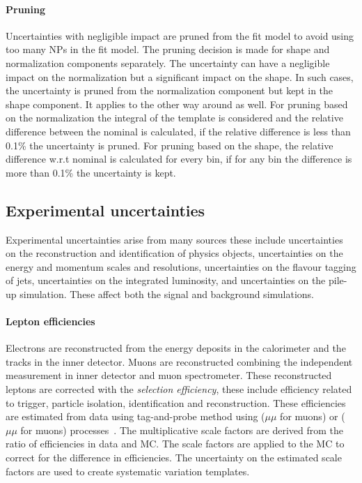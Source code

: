 \paragraph{Pruning}Uncertainties with negligible impact are pruned from the fit model to avoid using too many NPs in the fit model. The pruning decision is made for shape and normalization components separately. The uncertainty can have a negligible impact on the normalization but a significant impact on the shape. In such cases, the uncertainty is pruned from the normalization component but kept in the shape component. It applies to the other way around as well. For pruning based on the normalization the integral of the template is considered and the relative difference between the nominal is calculated, if the relative difference is less than 0.1\% the uncertainty is pruned. For pruning based on the shape, the relative difference w.r.t nominal is calculated for every bin, if for any bin the difference is more than 0.1\% the uncertainty is kept.


\subsection{Experimental uncertainties}
\label{sec:experimental_uncertainties}
Experimental uncertainties arise from many sources these include uncertainties on the reconstruction and identification of physics objects, uncertainties on the energy and momentum scales and resolutions, uncertainties on the flavour tagging of jets, uncertainties on the integrated luminosity, and uncertainties on the pile-up simulation. These affect both the signal and background simulations. 

\paragraph{Lepton efficiencies}
Electrons are reconstructed from the energy deposits in the calorimeter and the tracks in the inner detector. Muons are reconstructed combining the independent measurement in inner detector and muon spectrometer. These reconstructed leptons are corrected with the \emph{selection efficiency}, these include efficiency related to trigger, particle isolation, identification and reconstruction. These efficiencies are estimated from data using tag-and-probe method using \zee($\mu\mu$ for muons)  or \jpsiee($\mu\mu$ for muons) processes~\cite{ATLAS:2019jvq}\cite{ATLAS:2016lqx}. The multiplicative scale factors are derived from the ratio of efficiencies in data and MC. The scale factors are applied to the MC to correct for the difference in efficiencies. The uncertainty on the estimated scale factors are used to create systematic variation templates.

